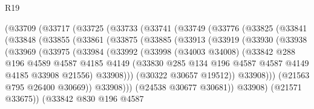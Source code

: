 \begin{lexlean}{R19}
\begin{coremodule}
        (@33709
          (@33717
            (@33725
              (@33733
                (@33741
                  (@33749
                    (@33776
                      (@33825
                        (@33841
                          (@33848
                            (@33855
                              (@33861
                                (@33875
                                  (@33885
                                    (@33913
                                      (@33919
                                        (@33930
                                          (@33938
                                            (@33969
                                              (@33975
                                                (@33984
                                                  (@33992
                                                    (@33998
                                                      (@34003 @34008)
                                                      (@33842
                                                        @288
                                                        @196
                                                        @4589
                                                        @4587
                                                        @4185
                                                        @4149
                                                        (@33830
                                                          @285
                                                          @134
                                                          @196
                                                          @4587
                                                          @4587
                                                          @4149
                                                          @4185
                                                          @33908
                                                          @21556)
                                                        @33908)))
                                                  (@30322 @30657 @19512))
                                                @33908)))
                                          (@21563 @795 @26400 @30669))
                                        @33908)))
                                  (@24538 @30677 @30681))
                                @33908)
                              (@21571 @33675))
                            (@33842
                              @830
                              @196
                              @4587

\end{coremodule}
\end{lexlean}
